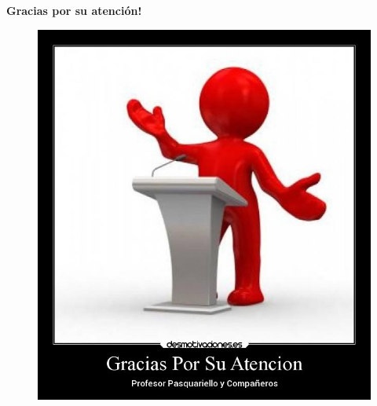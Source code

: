 \documentclass[11pt]{beamer}
\begin{document}
\begin{frame}{\textbf{\LARGE{Gracias por su atención!}}}
      \begin{figure}[H]
        {\includegraphics[width=.5\textwidth,clip,trim=2cm 5cm 3cm 2cm]{./imagenes/gracias.jpg}}
      \end{figure}	
\end{frame}
\end{document}
